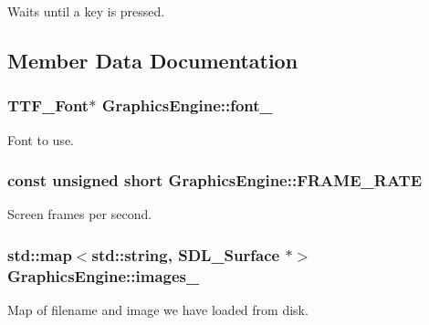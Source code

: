 Waits until a key is pressed. 



\subsection{Member Data Documentation}
\hypertarget{classGraphicsEngine_aea94592fe91edfb3983a0ee088f2888b}{
\subsubsection[{font\-\_\-}]{\setlength{\rightskip}{0pt plus 5cm}T\-T\-F\-\_\-\-Font$\ast$ Graphics\-Engine\-::font\-\_\-\hspace{0.3cm}{\ttfamily [private]}}}\label{classGraphicsEngine_aea94592fe91edfb3983a0ee088f2888b}


Font to use. 

\hypertarget{classGraphicsEngine_a488d694ad4eea9bbbe68fc4d98cde8bf}{
\subsubsection[{F\-R\-A\-M\-E\-\_\-\-R\-A\-T\-E}]{\setlength{\rightskip}{0pt plus 5cm}const unsigned short Graphics\-Engine\-::\-F\-R\-A\-M\-E\-\_\-\-R\-A\-T\-E\hspace{0.3cm}{\ttfamily [private]}}}\label{classGraphicsEngine_a488d694ad4eea9bbbe68fc4d98cde8bf}


Screen frames per second. 

\hypertarget{classGraphicsEngine_a5058ffe9d65389df4207db6be00ac889}{
\subsubsection[{images\-\_\-}]{\setlength{\rightskip}{0pt plus 5cm}std\-::map$<$std\-::string, S\-D\-L\-\_\-\-Surface $\ast$$>$ Graphics\-Engine\-::images\-\_\-\hspace{0.3cm}{\ttfamily [private]}}}\label{classGraphicsEngine_a5058ffe9d65389df4207db6be00ac889}


Map of filename and image we have loaded from disk. 

